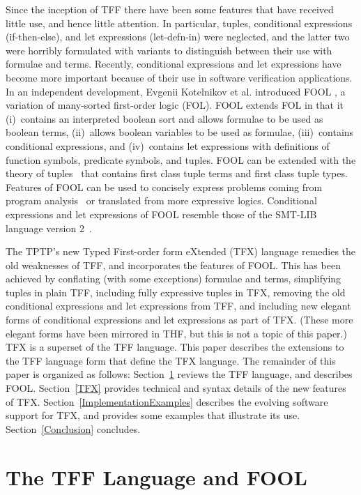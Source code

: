 \documentclass{easychair}
\begin{document}
Since the inception of TFF there have been some features that have 
received little use, and hence little attention. 
In particular, tuples, conditional expressions (if-then-else), and let 
expressions (let-defn-in) were neglected, and the latter two were horribly 
formulated with variants to distinguish between their use with formulae and 
terms. 
Recently, conditional expressions and let expressions have become more 
important because of their use in software verification applications.
In an independent development, Evgenii Kotelnikov et al. introduced FOOL
\cite{KKV15}, a variation of many-sorted first-order logic (FOL).
FOOL extends FOL in that it (i)~contains an interpreted boolean
sort and allows formulae to be used as boolean terms, (ii)~allows boolean
variables to be used as formulae, (iii)~contains conditional expressions, and
(iv)~contains let expressions with definitions of function symbols, predicate
symbols, and tuples. 
FOOL can be extended with the theory of tuples~\cite{KKV18}
that contains first class tuple terms and first class tuple types. 
Features of FOOL can be used to concisely express problems coming from program
analysis~\cite{KKV18} or translated from more expressive logics. 
Conditional expressions and let expressions of FOOL resemble those of the 
SMT-LIB language version 2~\cite{BST10}.

The TPTP's new Typed First-order form eXtended (TFX) language remedies the
old weaknesses of TFF, and incorporates the features of FOOL.
This has been achieved by conflating (with some exceptions) formulae and 
terms, simplifying tuples in plain TFF, including fully expressive tuples in 
TFX, removing the old conditional expressions and let expressions from 
TFF, and including new elegant forms of conditional expressions and let 
expressions as part of TFX. 
(These more elegant forms have been mirrored in THF, but this is not a topic of
this paper.)
TFX is a superset of the TFF language. 
This paper describes the extensions to the TFF language form that define the 
TFX language.
The remainder of this paper is organized as follows:
Section~\ref{TPTPFOOL} reviews the TFF language, and describes FOOL.
Section~\ref{TFX} provides technical and syntax details of the new features 
of TFX.
Section~\ref{ImplementationExamples} describes the evolving software 
support for TFX, and provides some examples that illustrate its use.
Section~\ref{Conclusion} concludes.

\section{The TFF Language and FOOL}
\label{TPTPFOOL}
\end{document}
